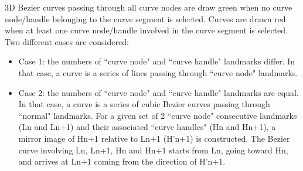 3D Bezier curves passing through all curve nodes are draw green when no curve node/handle belonging to
the curve segment is selected. Curves are drawn red when at least one curve node/handle involved in the
curve segment is selected. Two different cases are considered:
\begin{itemize}

\item Case 1: the numbers of ``curve node" and ``curve handle" landmarks differ. In that case, a curve is a series of lines passing through ``curve node" landmarks.
\item Case 2: the numbers of ``curve node" and ``curve handle" landmarks are equal. In that case, a curve is a
series of cubic Bezier curves passing through ``normal" landmarks. For a given set of 2 ``curve node"
consecutive landmarks (Ln and Ln+1) and their associated ``curve handles" (Hn and Hn+1), a mirror
image of Hn+1 relative to Ln+1 (H'n+1) is constructed. The Bezier curve involving Ln, Ln+1, Hn and
Hn+1 starts from Ln, going toward Hn, and arrives at Ln+1 coming from the direction of H'n+1.

\end{itemize}


